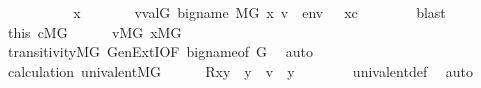 \begin{isabellebody}
\ \ \ \ \isamarkupfalse%
\isanewline
\ \ \ \ \isamarkupfalse%
\ x\ \isanewline
\ \ \ \ \ \ {\isachardoublequoteopen}v{\isasymin}val{\isacharparenleft}{\kern0pt}G{\isacharcomma}{\kern0pt}\ {\isacharquery}{\kern0pt}big{\isacharunderscore}{\kern0pt}name{\isacharparenright}{\kern0pt}{\isachardoublequoteclose}\ {\isachardoublequoteopen}M{\isacharbrackleft}{\kern0pt}G{\isacharbrackright}{\kern0pt}{\isacharcomma}{\kern0pt}\ {\isacharbrackleft}{\kern0pt}x{\isacharcomma}{\kern0pt}\ v{\isacharbrackright}{\kern0pt}\ {\isacharat}{\kern0pt}\ env\ {\isasymTurnstile}\ {\isasymphi}{\isachardoublequoteclose}\ {\isachardoublequoteopen}x{\isasymin}c{\isachardoublequoteclose}\isanewline
\ \ \ \ \ \ \isamarkupfalse%
\ blast\isanewline
\ \ \ \ \isamarkupfalse%
\ \isamarkupfalse%
\ this\ {\isacartoucheopen}c{\isasymin}M{\isacharbrackleft}{\kern0pt}G{\isacharbrackright}{\kern0pt}{\isacartoucheclose}\isanewline
\ \ \ \ \isamarkupfalse%
\ {\isachardoublequoteopen}v{\isasymin}M{\isacharbrackleft}{\kern0pt}G{\isacharbrackright}{\kern0pt}{\isachardoublequoteclose}\ {\isachardoublequoteopen}x{\isasymin}M{\isacharbrackleft}{\kern0pt}G{\isacharbrackright}{\kern0pt}{\isachardoublequoteclose}\isanewline
\ \ \ \ \ \ \isamarkupfalse%
\ transitivity{\isacharunderscore}{\kern0pt}MG\ GenExtI{\isacharbrackleft}{\kern0pt}OF\ {\isacartoucheopen}{\isacharquery}{\kern0pt}big{\isacharunderscore}{\kern0pt}name{\isasymin}{\isacharunderscore}{\kern0pt}{\isacartoucheclose}{\isacharcomma}{\kern0pt}of\ G{\isacharbrackright}{\kern0pt}\ \isamarkupfalse%
\ auto\isanewline
\ \ \ \ \isamarkupfalse%
\ \isamarkupfalse%
\ calculation\ {\isacartoucheopen}univalent{\isacharparenleft}{\kern0pt}{\isacharhash}{\kern0pt}{\isacharhash}{\kern0pt}M{\isacharbrackleft}{\kern0pt}G{\isacharbrackright}{\kern0pt}{\isacharcomma}{\kern0pt}{\isacharunderscore}{\kern0pt}{\isacharcomma}{\kern0pt}{\isacharunderscore}{\kern0pt}{\isacharparenright}{\kern0pt}{\isacartoucheclose}\isanewline
\ \ \ \ \isamarkupfalse%
\ {\isachardoublequoteopen}{\isacharquery}{\kern0pt}R{\isacharparenleft}{\kern0pt}x{\isacharcomma}{\kern0pt}y{\isacharparenright}{\kern0pt}\ {\isasymLongrightarrow}\ y\ {\isacharequal}{\kern0pt}\ v{\isachardoublequoteclose}\ \ y\isanewline
\ \ \ \ \ \ \isamarkupfalse%
\ univalent{\isacharunderscore}{\kern0pt}def\ \isamarkupfalse%
\ auto\isanewline
\ \ \ \ \isamarkupfalse%

\end{isabellebody}
